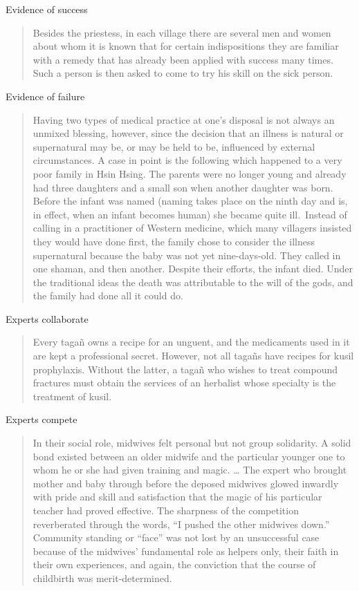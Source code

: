 \documentclass[
]{article}
\begin{document}
Evidence of success

\begin{quote}
Besides the priestess, in each village there are several men and women about whom it is known that for certain indispositions they are familiar with a remedy that has already been applied with success many times. Such a person is then asked to come to try his skill on the sick person.
\end{quote}

Evidence of failure

\begin{quote}
Having two types of medical practice at one's disposal is not always an unmixed blessing, however, since the decision that an illness is natural or supernatural may be, or may be held to be, influenced by external circumstances. A case in point is the following which happened to a very poor family in Hsin Hsing. The parents were no longer young and already had three daughters and a small son when another daughter was born. Before the infant was named (naming takes place on the ninth day and is, in effect, when an infant becomes human) she became quite ill.~Instead of calling in a practitioner of Western medicine, which many villagers insisted they would have done first, the family chose to consider the illness supernatural because the baby was not yet nine-days-old. They called in one shaman, and then another. Despite their efforts, the infant died. Under the traditional ideas the death was attributable to the will of the gods, and the family had done all it could do.
\end{quote}

Experts collaborate

\begin{quote}
Every tagañ owns a recipe for an unguent, and the medicaments used in it are kept a professional secret. However, not all tagañs have recipes for kusil prophylaxis. Without the latter, a tagañ who wishes to treat compound fractures must obtain the services of an herbalist whose specialty is the treatment of kusil.
\end{quote}

Experts compete

\begin{quote}
In their social role, midwives felt personal but not group solidarity. A solid bond existed between an older midwife and the particular younger one to whom he or she had given training and magic. \ldots{} The expert who brought mother and baby through before the deposed midwives glowed inwardly with pride and skill and satisfaction that the magic of his particular teacher had proved effective. The sharpness of the competition reverberated through the words, ``I pushed the other midwives down.'' Community standing or ``face'' was not lost by an unsuccessful case because of the midwives' fundamental role as helpers only, their faith in their own experiences, and again, the conviction that the course of childbirth was merit-determined.
\end{quote}
\end{document}
